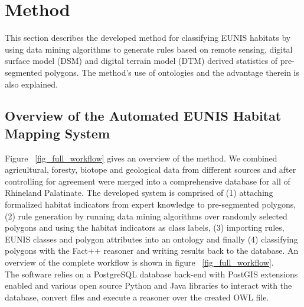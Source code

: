 \documentclass[authoryear, review,12pt,number]{elsarticle}
\begin{document}
\section{Method}
This section describes the developed method for classifying EUNIS habitats by
using data mining algorithms to generate rules based on remote sensing, digital
surface model (DSM) and digital terrain model (DTM) derived statistics of
pre-segmented polygons. The method's use of ontologies and the advantage
therein is also explained.
\subsection{Overview of the Automated EUNIS Habitat Mapping System}
Figure ~\ref{fig_full_workflow} gives an overview of the method. We combined
agricultural, foresty, biotope and geological data from different sources
and after controlling for agreement were merged into a comprehensive database
for all of Rhineland Palatinate. 
The developed system is comprised of (1) attaching
formalized habitat indicators from expert knowledge to pre-segmented polygons,
(2) rule generation by running data mining algorithms over randomly selected
polygons and using the habitat indicators as class labels, (3) importing rules,
EUNIS classes and polygon attributes into an ontology and finally (4)
classifying polygons with the Fact++ reasoner \citep{Tsarkov2006} and writing
results back to the database. 
An overview of the complete workflow is shown in
figure ~\ref{fig_full_workflow}.\\ %
The software relies on a PostgreSQL database back-end with PostGIS extensions
enabled and various open source Python and Java libraries to interact with the
database, convert files and execute a reasoner over the created OWL file.
\end{document}
